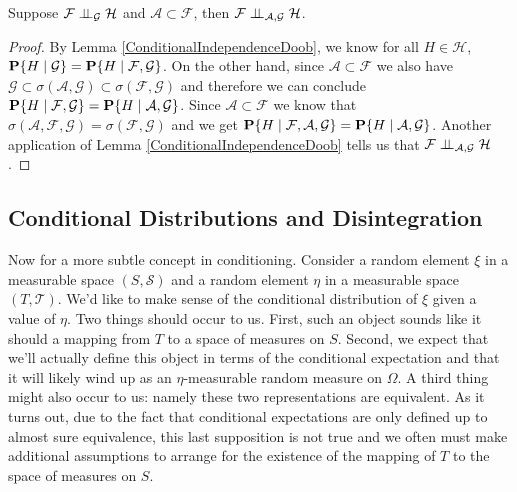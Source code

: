 \begin{lem}Suppose $\cindependent{\mathcal{F}}{\mathcal{H}}{\mathcal{G}}$ and $\mathcal{A} \subset \mathcal{F}$,
  then $\cindependent{\mathcal{F}}{\mathcal{H}}{\mathcal{A},\mathcal{G}}$.
\end{lem}
\begin{proof}
By Lemma \ref{ConditionalIndependenceDoob}, we know for all $H \in
\mathcal{H}$, 
$\cprobability{\mathcal{G}}{H} =
\cprobability{\mathcal{F},\mathcal{G}}{H}$. On the other hand, since
$\mathcal{A} \subset \mathcal{F}$ we also have $\mathcal{G} \subset
\sigma(\mathcal{A}, \mathcal{G}) \subset \sigma(\mathcal{F},
\mathcal{G})$ and therefore we can conclude
$\cprobability{\mathcal{F},\mathcal{G}}{H} = \cprobability{\mathcal{A},\mathcal{G}}{H}$.
Since $\mathcal{A} \subset \mathcal{F}$ we know that $\sigma(\mathcal{A},
\mathcal{F}, \mathcal{G}) = \sigma(\mathcal{F}, \mathcal{G})$ and we
get $\cprobability{\mathcal{F},\mathcal{A},\mathcal{G}}{H} =
\cprobability{\mathcal{A},\mathcal{G}}{H}$.
Another application of Lemma \ref{ConditionalIndependenceDoob} tells
us that $\cindependent{\mathcal{F}}{\mathcal{H}}{\mathcal{A},\mathcal{G}}$.
\end{proof}

\subsection{Conditional Distributions and Disintegration}
Now for a more subtle concept in conditioning.  Consider a random
element $\xi$ in a measurable space $(S,\mathcal{S})$ and a random
element $\eta$ in a measurable space $(T,\mathcal{T})$.  We'd like to
make sense of the conditional distribution of $\xi$ given a value of
$\eta$.  Two things should occur to us.  First, such an object sounds
like it should a mapping from $T$ to a space of measures on $S$.  Second, we
expect that we'll actually define this object in terms of the
conditional expectation and that it will likely wind up as an
$\eta$-measurable random measure on $\Omega$.  A third thing might also
occur to us: namely these two representations are equivalent.  As it
turns out, due to the fact that conditional expectations are only
defined up to almost sure equivalence, this last supposition is not true and we often must make
additional assumptions to arrange for the existence of the mapping of
$T$ to the space of measures on $S$. 

